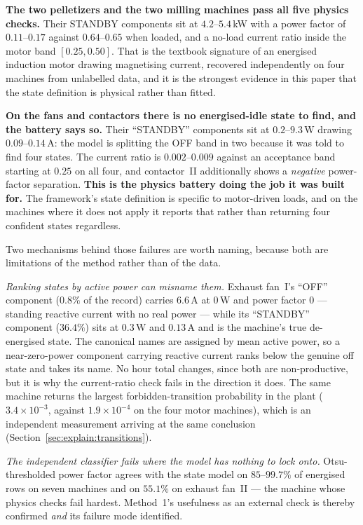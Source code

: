 \textbf{The two pelletizers and the two milling machines pass all five
physics checks.} Their STANDBY components sit at $4.2$--$5.4$\,kW with a
power factor of $0.11$--$0.17$ against $0.64$--$0.65$ when loaded, and a
no-load current ratio inside the motor band $[0.25,0.50]$. That is the
textbook signature of an energised induction motor drawing magnetising
current, recovered independently on four machines from unlabelled data,
and it is the strongest evidence in this paper that the state definition
is physical rather than fitted.

\textbf{On the fans and contactors there is no energised-idle state to
find, and the battery says so.} Their ``STANDBY'' components sit at
$0.2$--$9.3$\,W drawing $0.09$--$0.14$\,A: the model is splitting the
OFF band in two because it was told to find four states. The current
ratio is $0.002$--$0.009$ against an acceptance band starting at
$0.25$ on all four, and contactor~II additionally shows a
\emph{negative} power-factor separation. \textbf{This is the physics
battery doing the job it was built for.} The framework's state
definition is specific to motor-driven loads, and on the machines where
it does not apply it reports that rather than returning four confident
states regardless.

Two mechanisms behind those failures are worth naming, because both are
limitations of the method rather than of the data.

\emph{Ranking states by active power can misname them.} Exhaust fan~I's
``OFF'' component ($0.8\%$ of the record) carries $6.6$\,A at $0$\,W and
power factor $0$ --- standing reactive current with no real power ---
while its ``STANDBY'' component ($36.4\%$) sits at $0.3$\,W and
$0.13$\,A and is the machine's true de-energised state. The canonical
names are assigned by mean active power, so a near-zero-power component
carrying reactive current ranks below the genuine off state and takes
its name. No hour total changes, since both are non-productive, but it
is why the current-ratio check fails in the direction it does. The same
machine returns the largest forbidden-transition probability in the
plant ($3.4\times10^{-3}$, against $1.9\times10^{-4}$ on the four motor
machines), which is an independent measurement arriving at the same
conclusion (Section~\ref{sec:explain:transitions}).

\emph{The independent classifier fails where the model has nothing to
lock onto.} Otsu-thresholded power factor agrees with the state model on
$85$--$99.7\%$ of energised rows on seven machines and on $\mathbf{55.1\%}$
on exhaust fan~II --- the machine whose physics checks fail hardest.
Method~1's usefulness as an external check is thereby confirmed
\emph{and} its failure mode identified.

